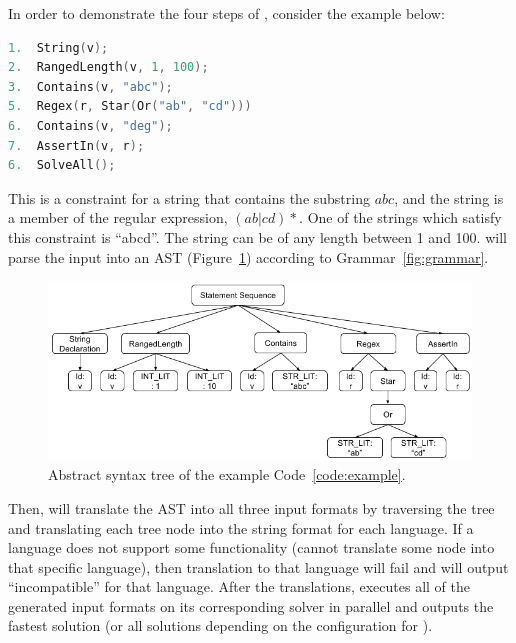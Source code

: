 In order to demonstrate the four steps of \imss, consider the example below:
\renewcommand\lstlistingname{Code}
\begin{lstlisting}[label={code:example},frame=bt,numbers=none,basicstyle=\ttfamily\scriptsize,
language=C,captionpos=b,caption={Input constraint in \imss format}]
1.  String(v);
2.  RangedLength(v, 1, 100);
3.  Contains(v, "abc");
5.  Regex(r, Star(Or("ab", "cd")))
6.  Contains(v, "deg");
7.  AssertIn(v, r);
6.  SolveAll();
\end{lstlisting}
This is a constraint for a string that contains the substring $abc$, and
the string is a member of the regular expression, $(ab|cd)*$.
One of the strings which satisfy this constraint is ``abcd''. The string can be of any length
between 1 and 100. \imss will parse the input into an AST (Figure~\ref{fig:exp-ast}) according to Grammar~\ref{fig:grammar}.

\begin{figure}
    \centering
    \includegraphics[scale=0.65]{example-ast}
    \caption{\label{fig:exp-ast}Abstract syntax tree of the example Code~\ref{code:example}.}
\end{figure}

Then, \imss will translate the AST into all three input formats by traversing the tree and
translating each tree node into the string format for each language. If a language does not support
some functionality (\imss cannot translate some node into that specific language),
then translation to that language will fail and \imss will output ``incompatible'' for that language. After the translations, \imss executes all of the generated input formats
on its corresponding solver in parallel and outputs the fastest solution (or all solutions depending on the configuration for \imss).
